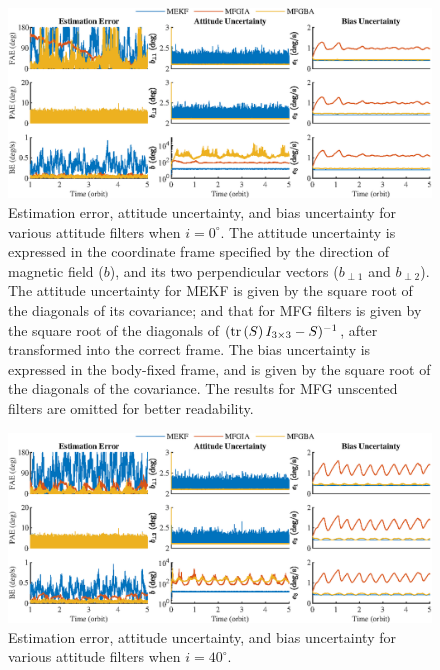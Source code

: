 \begin{figure}
	\centering
	\includegraphics[scale=0.97]{figures/attEst-sim3-error-i0}
	\caption[Estimation error, attitude uncertainty, and bias uncertainty for various attitude filters when $i=0^\circ$.]{Estimation error, attitude uncertainty, and bias uncertainty for various attitude filters when $i=0^\circ$.
		The attitude uncertainty is expressed in the coordinate frame specified by the direction of magnetic field ($b$), and its two perpendicular vectors ($b_{\perp 1}$ and $b_{\perp 2}$).
		The attitude uncertainty for MEKF is given by the square root of the diagonals of its covariance; and that for MFG filters is given by the square root of the diagonals of $(\mathrm{tr}\left( S \right)I_{3\times 3}-S)^{-1}$, after transformed into the correct frame.
		The bias uncertainty is expressed in the body-fixed frame, and is given by the square root of the diagonals of the covariance.
		The results for MFG unscented filters are omitted for better readability.}
	\label{fig:attEst-sim3-error-i0}
\end{figure}

\begin{figure}
	\centering
	\includegraphics[scale=0.97]{figures/attEst-sim3-error-i40}
	\caption{Estimation error, attitude uncertainty, and bias uncertainty for various attitude filters when $i=40^\circ$.}
	\label{fig:attEst-sim3-error-i40}
\end{figure}

